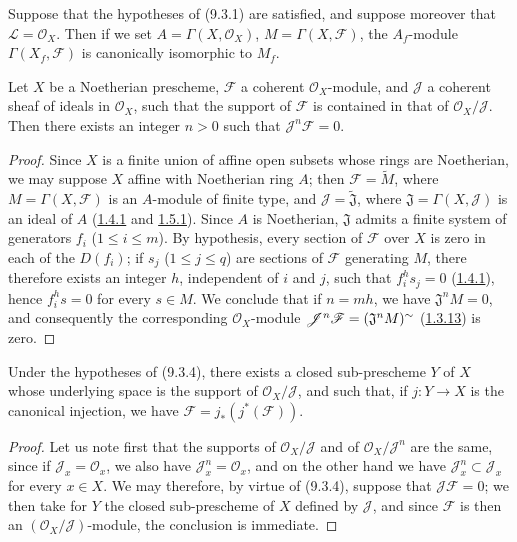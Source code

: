 \begin{corollary}[9.3.3]
\label{I.9.3.3}
Suppose that the hypotheses of (9.3.1) are satisfied, and suppose moreover
that $\mathscr{L}=\mathscr{O}_X$. Then if we set
$A=\Gamma(X,\mathscr{O}_X)$, $M=\Gamma(X,\mathscr{F})$, the $A_f$-module
$\Gamma(X_f,\mathscr{F})$ is canonically isomorphic to $M_f$.
\end{corollary}

\begin{proposition}[9.3.4]
\label{I.9.3.4}
Let $X$ be a Noetherian prescheme, $\mathscr{F}$ a coherent
$\mathscr{O}_X$-module, and $\mathscr{J}$ a coherent sheaf of ideals in
$\mathscr{O}_X$, such that the support of $\mathscr{F}$ is contained in
that of $\mathscr{O}_X/\mathscr{J}$. Then there exists an integer $n>0$
such that $\mathscr{J}^n\mathscr{F}=0$.
\end{proposition}

\begin{proof}
Since $X$ is a finite union of affine open subsets whose rings are
Noetherian, we may suppose $X$ affine with Noetherian ring $A$; then
$\mathscr{F}=\widetilde M$, where $M=\Gamma(X,\mathscr{F})$ is an $A$-module
of finite type, and $\mathscr{J}=\widetilde{\mathfrak{J}}$, where
$\mathfrak{J}=\Gamma(X,\mathscr{J})$ is an ideal of $A$
(\hyperref[I.1.4.1]{1.4.1} and \hyperref[I.1.5.1]{1.5.1}). Since $A$
is Noetherian, $\mathfrak{J}$ admits a finite system of generators $f_i$
($1\leq i\leq m$). By hypothesis, every section of $\mathscr{F}$ over $X$
is zero in each of the $D(f_i)$; if $s_j$ ($1\leq j\leq q$) are sections of
$\mathscr{F}$ generating $M$, there therefore exists an integer $h$,
independent of $i$ and $j$, such that $f_i^h s_j=0$
(\hyperref[I.1.4.1]{1.4.1}), hence $f_i^h s=0$ for every $s\in M$. We
conclude that if $n=mh$, we have $\mathfrak{J}^nM=0$, and consequently the
corresponding $\mathscr{O}_X$-module
$\mathscr{J}^n\mathscr{F}=(\mathfrak{J}^nM)^{\sim}$
(\hyperref[I.1.3.13]{1.3.13}) is zero.
\end{proof}

\begin{corollary}[9.3.5]
\label{I.9.3.5}
Under the hypotheses of (9.3.4), there exists a closed sub-prescheme $Y$ of
$X$ whose underlying space is the support of
$\mathscr{O}_X/\mathscr{J}$, and such that, if $j:Y\to X$ is the canonical
injection, we have $\mathscr{F}=j_*(j^*(\mathscr{F}))$.
\end{corollary}

\begin{proof}
Let us note first that the supports of $\mathscr{O}_X/\mathscr{J}$ and of
$\mathscr{O}_X/\mathscr{J}^n$ are the same, since if
$\mathscr{J}_x=\mathscr{O}_x$, we also have
$\mathscr{J}_x^n=\mathscr{O}_x$, and on the other hand we have
$\mathscr{J}_x^n\subset\mathscr{J}_x$ for every $x\in X$. We may therefore,
by virtue of (9.3.4), suppose that $\mathscr{J}\mathscr{F}=0$; we then take
for $Y$ the closed sub-prescheme of $X$ defined by $\mathscr{J}$, and since
$\mathscr{F}$ is then an $(\mathscr{O}_X/\mathscr{J})$-module, the
conclusion is immediate.
\end{proof}

